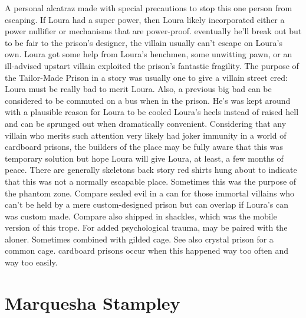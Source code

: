 \documentclass[12pt]{book}
\begin{document}
A personal alcatraz made with special precautions to stop this one person from escaping. If Loura had a super power, then Loura likely incorporated either a power nullifier or mechanisms that are power-proof. eventually he'll break out but to be fair to the prison's designer, the villain usually can't escape on Loura's own. Loura got some help from Loura's henchmen, some unwitting pawn, or an ill-advised upstart villain exploited the prison's fantastic fragility. The purpose of the Tailor-Made Prison in a story was usually one to give a villain street cred: Loura must be really bad to merit Loura. Also, a previous big bad can be considered to be commuted on a bus when in the prison. He's was kept around with a plausible reason for Loura to be cooled Loura's heels instead of raised hell and can be sprunged out when dramatically convenient. Considering that any villain who merits such attention very likely had joker immunity in a world of cardboard prisons, the builders of the place may be fully aware that this was temporary solution but hope Loura will give Loura, at least, a few months of peace. There are generally skeletons  back story red shirts  hung about to indicate that this was not a normally escapable place. Sometimes this was the purpose of the phantom zone. Compare sealed evil in a can for those immortal villains who can't be held by a mere custom-designed prison but can overlap if Loura's can was custom made. Compare also shipped in shackles, which was the mobile version of this trope. For added psychological trauma, may be paired with the aloner. Sometimes combined with gilded cage. See also crystal prison for a common cage. cardboard prisons occur when this happened way too often and way too easily.



\chapter{Marquesha Stampley}
\end{document}
